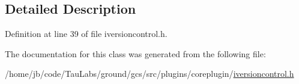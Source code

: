 \subsection{\-Detailed \-Description}


\-Definition at line 39 of file iversioncontrol.\-h.



\-The documentation for this class was generated from the following file\-:\begin{DoxyCompactItemize}
\item 
/home/jb/code/\-Tau\-Labs/ground/gcs/src/plugins/coreplugin/\hyperlink{iversioncontrol_8h}{iversioncontrol.\-h}\end{DoxyCompactItemize}
